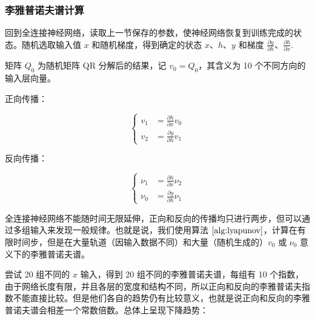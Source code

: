 \subsubsection{李雅普诺夫谱计算}

回到全连接神经网络，读取上一节保存的参数，使神经网络恢复到训练完成的状态。随机选取输入值 $x$ 和随机梯度，得到确定的状态 $x$、$h$、$y$ 和梯度 $\frac{\partial y}{\partial h}$、$\frac{\partial h}{\partial x}$.

矩阵 $Q_0$ 为随机矩阵 QR 分解后的结果，记 $v_0 = Q_0$，其含义为 10 个不同方向的输入层向量。

正向传播：

\begin{equation}
  \left\{
    \begin{aligned}
      v_1 &= \frac{\partial h}{\partial x} v_0 \\
      v_2 &= \frac{\partial y}{\partial h} v_1
    \end{aligned}
  \right.
\end{equation}

反向传播：

\begin{equation}
  \left\{
    \begin{aligned}
      \nu_1 &= \frac{\partial h}{\partial x} \nu_2 \\
      \nu_0 &= \frac{\partial y}{\partial h} \nu_1
    \end{aligned}
  \right.
\end{equation}


全连接神经网络不能随时间无限延伸，正向和反向的传播均只进行两步，但可以通过多组输入来发现一般规律。也就是说，我们使用算法 $\ref{alg:lyapunov}$，计算在有限时间步，但是在大量轨道（因输入数据不同）和大量（随机生成的）$v_0$ 或 $\nu_0$ 意义下的李雅普诺夫谱。


尝试 20 组不同的 $x$ 输入，得到 20 组不同的李雅普诺夫谱，每组有 10 个指数，由于网络长度有限，并且各层的宽度和结构不同，所以正向和反向的李雅普诺夫指数不能直接比较。但是他们各自的趋势仍有比较意义，也就是说正向和反向的李雅普诺夫谱会相差一个常数倍数。总体上呈现下降趋势：

